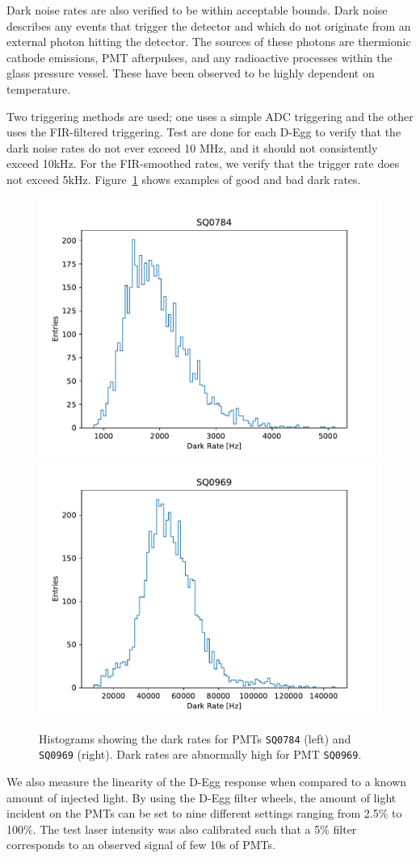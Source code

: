\documentclass[main.tex]{subfiles}
\begin{document}
Dark noise rates are also verified to be within acceptable bounds.
Dark noise describes any events that trigger the detector and which do not originate from an external photon hitting the detector. 
The sources of these photons are thermionic cathode emissions, PMT afterpulses, and any radioactive processes within the glass pressure vessel. 
These have been observed to be highly dependent on temperature. 

Two triggering methods are used; one uses a simple ADC triggering and the other uses the FIR-filtered triggering. Test are done for each D-Egg to verify that the dark noise rates do not ever exceed 10 MHz, and it should not consistently exceed 10kHz.
For the FIR-smoothed rates, we verify that the trigger rate does not exceed 5kHz. 
Figure~\ref{fig:dark_rate} shows examples of good and bad dark rates. 

\begin{figure}
    \centering
    \includegraphics[width=0.45\linewidth]{./figures/dark_rate_SQ0784.pdf}%
    \includegraphics[width=0.45\linewidth]{./figures/dark_rate_SQ0969.pdf}
    \caption{Histograms showing the dark rates for PMTs \texttt{SQ0784} (left) and \texttt{SQ0969} (right). Dark rates are abnormally high for PMT \texttt{SQ0969}.}\label{fig:dark_rate}
\end{figure}

We also measure the linearity of the D-Egg response when compared to a known amount of injected light. 
By using the D-Egg filter wheels, the amount of light incident on the PMTs can be set to nine different settings ranging from 2.5\% to 100\%. 
The test laser intensity was also calibrated such that a 5\% filter corresponds to an observed signal of few 10s of PMTs. 
\end{document}
